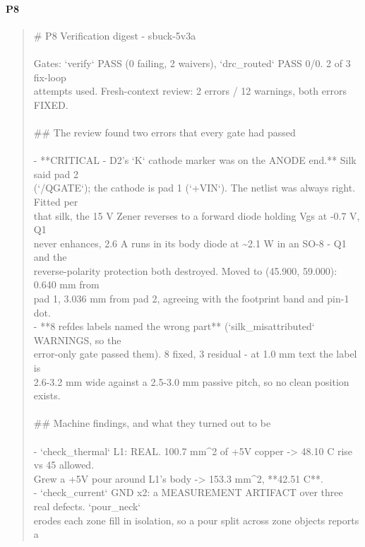 \documentclass[11pt,a4paper]{article}
\begin{document}
\paragraph*{P8}
\begin{quote}\small\ttfamily\raggedright
\# P8 Verification digest - sbuck-5v3a\\
~\\
Gates: `verify` PASS (0 failing, 2 waivers), `drc\_routed` PASS 0/0. 2 of 3 fix-loop\\
attempts used. Fresh-context review: 2 errors / 12 warnings, both errors FIXED.\\
~\\
\#\# The review found two errors that every gate had passed\\
~\\
- {*}{*}CRITICAL - D2's `K` cathode marker was on the ANODE end.{*}{*} Silk said pad 2\\
  (`/QGATE`); the cathode is pad 1 (`+VIN`). The netlist was always right. Fitted per\\
  that silk, the 15 V Zener reverses to a forward diode holding Vgs at -0.7 V, Q1\\
  never enhances, 2.6 A runs in its body diode at \textasciitilde{}2.1 W in an SO-8 - Q1 and the\\
  reverse-polarity protection both destroyed. Moved to (45.900, 59.000): 0.640 mm from\\
  pad 1, 3.036 mm from pad 2, agreeing with the footprint band and pin-1 dot.\\
- {*}{*}8 refdes labels named the wrong part{*}{*} (`silk\_misattributed` WARNINGS, so the\\
  error-only gate passed them). 8 fixed, 3 residual - at 1.0 mm text the label is\\
  2.6-3.2 mm wide against a 2.5-3.0 mm passive pitch, so no clean position exists.\\
~\\
\#\# Machine findings, and what they turned out to be\\
~\\
- `check\_thermal` L1: REAL. 100.7 mm\textasciicircum{}2 of +5V copper -\textgreater{} 48.10 C rise vs 45 allowed.\\
  Grew a +5V pour around L1's body -\textgreater{} 153.3 mm\textasciicircum{}2, {*}{*}42.51 C{*}{*}.\\
- `check\_current` GND x2: a MEASUREMENT ARTIFACT over three real defects. `pour\_neck`\\
  erodes each zone fill in isolation, so a pour split across zone objects reports a\\

\end{quote}
\end{document}
